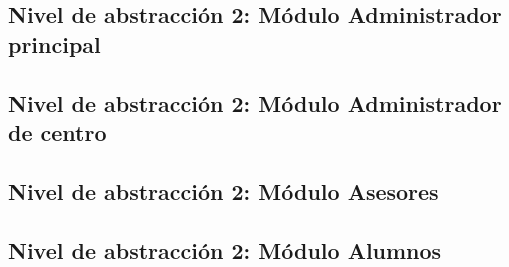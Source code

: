 \subsection{Nivel de abstracción 2: Módulo Administrador principal}



\subsection{Nivel de abstracción 2: Módulo Administrador de centro}



\subsection{Nivel de abstracción 2: Módulo Asesores}



\subsection{Nivel de abstracción 2: Módulo Alumnos}

